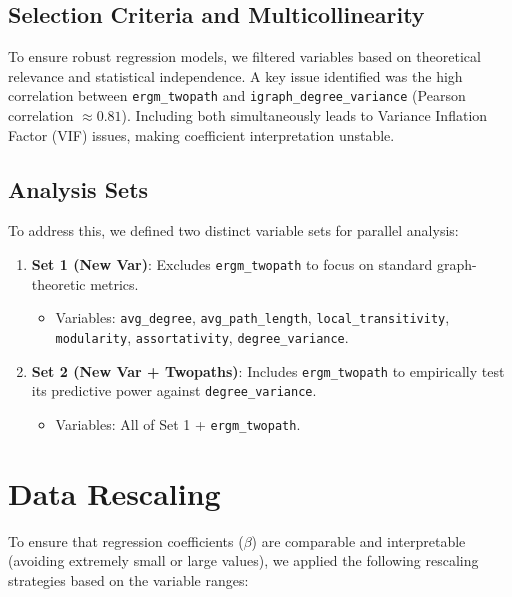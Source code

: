 \documentclass{article}
\begin{document}
\subsection{Selection Criteria and Multicollinearity}
To ensure robust regression models, we filtered variables based on theoretical relevance and statistical independence. A key issue identified was the high correlation between \texttt{ergm\_twopath} and \texttt{igraph\_degree\_variance} (Pearson correlation $\approx 0.81$). Including both simultaneously leads to Variance Inflation Factor (VIF) issues, making coefficient interpretation unstable.

\subsection{Analysis Sets}
To address this, we defined two distinct variable sets for parallel analysis:

\begin{enumerate}
    \item \textbf{Set 1 (New Var)}: Excludes \texttt{ergm\_twopath} to focus on standard graph-theoretic metrics.
    \begin{itemize}
        \item Variables: \texttt{avg\_degree}, \texttt{avg\_path\_length}, \texttt{local\_transitivity}, \texttt{modularity}, \texttt{assortativity}, \texttt{degree\_variance}.
    \end{itemize}
    
    \item \textbf{Set 2 (New Var + Twopaths)}: Includes \texttt{ergm\_twopath} to empirically test its predictive power against \texttt{degree\_variance}.
    \begin{itemize}
        \item Variables: All of Set 1 + \texttt{ergm\_twopath}.
    \end{itemize}
\end{enumerate}

\section{Data Rescaling}
To ensure that regression coefficients ($\beta$) are comparable and interpretable (avoiding extremely small or large values), we applied the following rescaling strategies based on the variable ranges:
\end{document}
